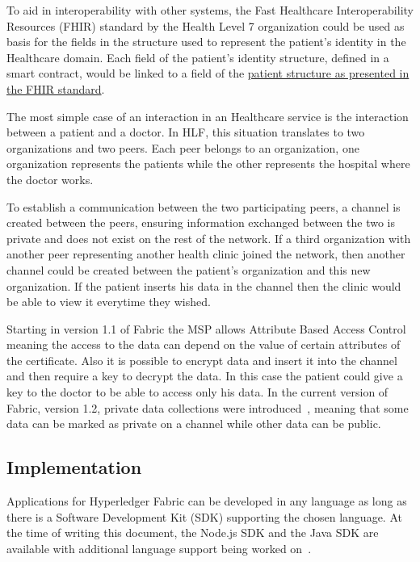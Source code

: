 To aid in interoperability with other systems, the Fast Healthcare
Interoperability Resources (FHIR) standard by the Health Level 7 organization
could be used as basis for the fields in the structure used to represent the
patient's identity in the Healthcare domain.  Each field of the patient's
identity structure, defined in a smart contract, would be linked to a field of
the \href{http://www.hl7.org/fhir/patient.html}{patient structure as presented
in the FHIR standard}.

The most simple case of an interaction in an Healthcare service is the
interaction between a patient and a doctor. In HLF, this situation translates
to two organizations and two peers. Each peer belongs to an organization, one
organization represents the patients while the other represents the hospital
where the doctor works. 

To establish a communication between the two participating peers, a channel is
created between the peers, ensuring information exchanged between the two is
private and does not exist on the rest of the network.  If a third organization
with another peer representing another health clinic joined the network, then
another channel could be created between the patient's organization and this
new organization. If the patient inserts his data in the channel then the
clinic would be able to view it everytime they wished. 

Starting in version 1.1 of Fabric the MSP allows Attribute Based Access Control
meaning the access to the data can depend on the value of certain attributes of
the certificate. Also it is possible to encrypt data and insert it into the
channel and then require a key to decrypt the data. In this case the patient
could give a key to the doctor to be able to access only his data. In the
current version of Fabric, version 1.2, private data collections were
introduced~\cite{hyperledgerRoadmap2018}, meaning that some data can be marked
as private on a channel while other data can be public.

\subsection{Implementation}

Applications for Hyperledger Fabric can be developed in any language as long as
there is a Software Development Kit (SDK) supporting the chosen language. At
the time of writing this document, the Node.js SDK and the Java SDK are
available with additional language support being worked
on~\cite{hyperledgerRoadmap2018}.


